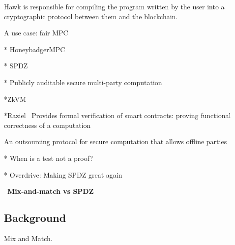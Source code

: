 Hawk is responsible for compiling the program written by the user into a cryptographic protocol between them and the blockchain.

A use case: fair MPC

* HoneybadgerMPC~\cite{lu2019honeybadgermpc}

* SPDZ~\cite{damgaard2012multiparty}
~\cite{damgaard2013practical}

* Publicly auditable secure multi-party computation~\cite{baum2014publicly}

*ZkVM~\cite{zkvm}

*Raziel~\cite{sanchez2018raziel}
Provides  formal verification of smart contracts: proving functional correctness of a
computation

An outsourcing protocol for secure computation that allows offline parties

* When is a test not a proof?~\cite{mcmurtry2020test}

* Overdrive: Making SPDZ great again~\cite{keller2018overdrive}

~\textbf{Mix-and-match vs SPDZ}



\subsection{Background}

Mix and Match.

